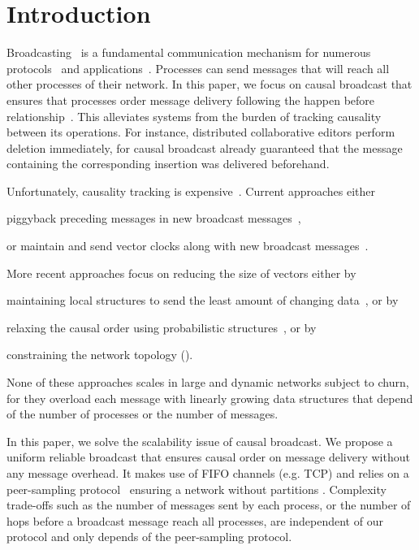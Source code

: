 
\section{Introduction}


Broadcasting~\cite{hadzilacos1994modular} is a fundamental communication
mechanism for numerous
protocols~\cite{nakamoto2009bitcoin,shapiro2011comprehensive} and
applications~\cite{nedelec2016crate}. Processes can send messages that will
reach all other processes of their network. In this paper, we focus on causal
broadcast that ensures that processes order message delivery following the
happen before relationship~\cite{lamport1978time}. This alleviates systems from
the burden of tracking causality between its operations. For instance,
distributed collaborative editors perform deletion immediately, for causal
broadcast already guaranteed that the message containing the corresponding
insertion was delivered beforehand.

Unfortunately, causality tracking is
expensive~\cite{charronbost1991concerning}. Current approaches either
\begin{inparaenum}[(i)]
\item piggyback preceding messages in new broadcast
  messages~\cite{birman1987reliable,hadzilacos1993fault},
\item or maintain and send vector clocks along with new broadcast
  messages~\cite{fidge1988timestamps,mattern1989virtual}.
\end{inparaenum}
More recent approaches focus on reducing the size of vectors either by
\begin{inparaenum}[(a)]
\item maintaining local structures to send the least amount of changing
  data~\cite{singhal1992efficient}, or by
\item relaxing the causal order using probabilistic
  structures~\cite{mostefaoui2017probabilistic}, or by
\item constraining the network topology (\REF).
\end{inparaenum}
None of these approaches scales in large and dynamic networks subject to churn,
for they overload each message with linearly growing data structures that depend
of the number of processes or the number of messages.

In this paper, we solve the scalability issue of causal broadcast. We propose a
uniform reliable broadcast that ensures causal order on message delivery without
any message overhead.  It makes use of FIFO channels (e.g. TCP) and relies on a
peer-sampling protocol~\cite{jelasity2007gossip} ensuring a network without
partitions .
Complexity trade-offs such as the number of messages sent by each process, or
the number of hops before a broadcast message reach all processes, are
independent of our protocol and only depends of the peer-sampling protocol.

